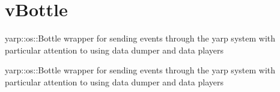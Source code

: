 \hypertarget{group__vBottle}{\section{v\-Bottle}
\label{group__vBottle}
}


yarp\-::os\-::\-Bottle wrapper for sending events through the yarp system with particular attention to using data dumper and data players  


yarp\-::os\-::\-Bottle wrapper for sending events through the yarp system with particular attention to using data dumper and data players 